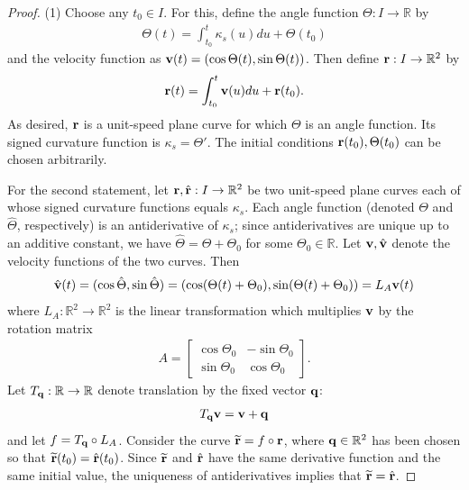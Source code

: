 \documentclass[12pt,letterpaper,reqno]{article}
\numberwithin{equation}{section}
\newcommand{\R}{\ensuremath{\mathbb R}}
\newcommand{\bv}{{\bf v}}
\newcommand{\bbr}{{\bf r}}
\newcommand{\fixme}[1]{{\color{orange}{[#1]}}}
\begin{document}
{\begin{proof}
	(1) Choose any $t_0 \in I$. For this, define the angle function $\Theta:I \to \R$ by
	\begin{align*}
		\Theta(t)=\int_{t_0}^t \kappa_s(u)du+\Theta(t_0)
	\end{align*}
	and the velocity function as $\bv(t)=(\cos \Theta(t),\sin \Theta(t))$. Then define $\bbr:I \to \R^2$ by
	\begin{align*}
		\bbr(t)=\int_{t_0}^t \bv(u)du+\bbr(t_0).
	\end{align*}
	As desired, $\bbr$ is a unit-speed plane curve for which $\Theta$ is an angle function. Its signed curvature function is $\kappa_s=\Theta'$. The initial conditions $\bbr(t_0), \Theta(t_0)$ can be chosen arbitrarily.
	
	For the second statement, let $\bbr,\hat{\bbr}:I \to \R^2$ be two unit-speed plane curves each of whose signed curvature functions equals $\kappa_s$. Each angle function (denoted $\Theta$ and $\hat{\Theta}$, respectively) is an antiderivative of $\kappa_s$; since antiderivatives are unique up to an additive constant, we have $\hat{\Theta}=\Theta+\Theta_0$ for some $\Theta_0 \in \R$. Let $\bv, \hat{\bv}$ denote the velocity functions of the two curves. Then
	\begin{align*}
		\hat{\bv}(t)=(\cos \hat{\Theta}, \sin \hat{\Theta})=(\cos(\Theta(t)+\Theta_0), \sin(\Theta(t)+\Theta_0))=L_A\bv(t)
	\end{align*}
	where $L_A:\R^2 \to \R^2$ is the linear transformation which multiplies $\bv$ by the rotation matrix 
	\begin{align*}
		A=\begin{bmatrix}
			\cos \Theta_0 & -\sin \Theta_0 \\
			\sin \Theta_0 & \cos \Theta_0
		\end{bmatrix}.
	\end{align*}
	\fixme{Show this.} Let $T_{\bf q}:\R \to \R$ denote translation by the fixed vector ${\bf q}$:
	\begin{align*}
		T_{\bf q}\bv=\bv+{\bf q}
	\end{align*}
	and let $f=T_{\bf q} \circ L_A$. Consider the curve $\widetilde{\bbr}=f \circ \bbr$, where ${\bf q} \in \R^2$ has been chosen so that $\widetilde{\bbr}(t_0)=\hat{\bbr}(t_0)$. Since $\widetilde{\bbr}$ and $\hat{\bbr}$ have the same derivative function and the same initial value, the uniqueness of antiderivatives implies that $\widetilde{\bbr}=\hat{\bbr}$. \fixme{Add some details.}
	\end{proof}


}
\end{document}
